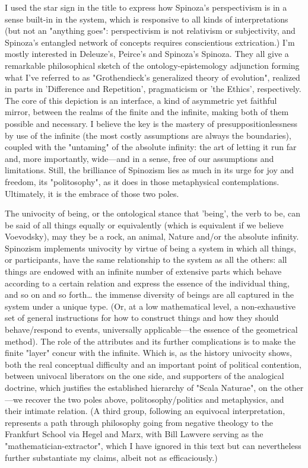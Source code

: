 \documentclass[11pt]{article}
\begin{document}
I used the star sign in the title to express how Spinoza's perspectivism is in a sense
built-in in the system, which is responsive to all kinds of interpretations (but not an
"anything goes": perspectivism is not relativism or subjectivity, and Spinoza's
entangled network of concepts requires conscientious extrication.) I'm mostly interested
in Deleuze's, Peirce's and Spinoza's Spinoza. They all give a remarkable philosophical
sketch of the ontology-epistemology adjunction forming what I've referred to as
"Grothendieck's generalized theory of evolution", realized in parts in 'Difference and
Repetition', pragmaticism or 'the Ethics', respectively. The core of this depiction is
an interface, a kind of asymmetric yet faithful mirror, between the realms of the finite
and the infinite, making both of them possible and necessary. I believe the key is the
mastery of presuppositionlessness by use of the infinite (the most costly assumptions
are always the boundaries), coupled with the "untaming" of the absolute infinity: the
art of letting it run far and, more importantly, wide---and in a sense, free of our
assumptions and limitations. Still, the brilliance of Spinozism lies as much in its urge
for joy and freedom, its "politosophy", as it does in those metaphysical contemplations.
Ultimately, it is the embrace of those two poles.

The univocity of being, or the ontological stance that 'being', the verb to be, can be
said of all things equally or equivalently (which is equivalent if we believe
Voevodsky), may they be a rock, an animal, Nature and/or the absolute infinity.
Spinozism implements univocity by virtue of being a system in which all things, or
participants, have the same relationship to the system as all the others: all things are
endowed with an infinite number of extensive parts which behave according to a certain
relation and express the essence of the individual thing, and so on and so forth\ldots{}
the immense diversity of beings are all captured in the system under a unique type. (Or,
at a low mathematical level, a non-exhaustive set of general instructions for how to
construct things and how they should behave/respond to events, universally
applicable---the essence of the geometrical method). The role of the attributes and its
further complications is to make the finite "layer" concur with the infinite. Which is,
as the history univocity shows, both the real conceptual difficulty and an important
point of political contention, between univocal liberators on the one side, and
supporters of the analogical doctrine, which justifies the established hierarchy of
"Scala Naturae", on the other---we recover the two poles above, politosophy/politics and
metaphysics, and their intimate relation. (A third group, following an equivocal
interpretation, represents a path through philosophy going from negative theology to the
Frankfurt School via Hegel and Marx, with Bill Lawvere serving as the
"mathematician-extractor", which I have ignored in this text but can nevertheless
further substantiate my claims, albeit not as efficaciously.)
\end{document}
